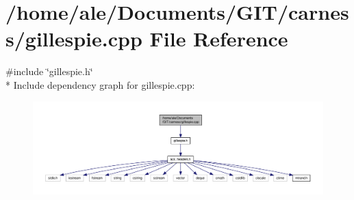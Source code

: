 \hypertarget{a00081}{\section{/home/ale/\-Documents/\-G\-I\-T/carness/gillespie.cpp File Reference}
\label{a00081}
}
{\ttfamily \#include \char`\"{}gillespie.\-h\char`\"{}}\\*
Include dependency graph for gillespie.\-cpp\-:\nopagebreak
\begin{figure}[H]
\begin{center}
\leavevmode
\includegraphics[width=350pt]{a00129}
\end{center}
\end{figure}
